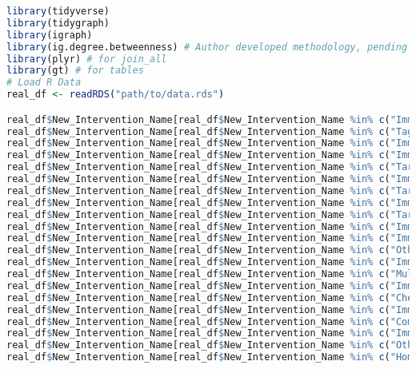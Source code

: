 \documentclass{article}
\begin{document}
\begin{lstlisting}[language=R]  % or Python, or whatever language
library(tidyverse)
library(tidygraph)
library(igraph)
library(ig.degree.betweenness) # Author developed methodology, pending public release
library(plyr) # for join_all
library(gt) # for tables
# Load R Data
real_df <- readRDS("path/to/data.rds")

real_df$New_Intervention_Name[real_df$New_Intervention_Name %in% c("Immunotherapy- MAbs-immunomodulatory-Checkpoint")] <- "I: MAbs Checkpoint";
real_df$New_Intervention_Name[real_df$New_Intervention_Name %in% c("Tageted therapy- antibody-drug conjugate")] <- "T: Antibody-Drug Conjugate";
real_df$New_Intervention_Name[real_df$New_Intervention_Name %in% c("Immunotherapy- MAbs-immunomodulatory-Co-Stimulatory")] <- "I: MAbs Co-Stimulatory";
real_df$New_Intervention_Name[real_df$New_Intervention_Name %in% c("Immunotherapy- Immuno + other investigational agent")] <- "I: Combined";
real_df$New_Intervention_Name[real_df$New_Intervention_Name %in% c("Targeted therapy - combined (small molecule + monoclonal antibody)")] <- "T: Combined";
real_df$New_Intervention_Name[real_df$New_Intervention_Name %in% c("Immunotherapy- MAbs- Tumour-targeting (includes immunoconjugates, naked MAbs)")] <- "I: MAbs Targeting";
real_df$New_Intervention_Name[real_df$New_Intervention_Name %in% c("Targeted therapy - small molecule")] <- "T: Small Molecule";
real_df$New_Intervention_Name[real_df$New_Intervention_Name %in% c("Immunotherapy- Other")] <- "I: Other";
real_df$New_Intervention_Name[real_df$New_Intervention_Name %in% c("Targeted therapy - monoclonal antibody")] <- "T: Monoclonal Antibody";
real_df$New_Intervention_Name[real_df$New_Intervention_Name %in% c("Immunotherapy- Adoptive Cell Transfer (e.g. TILS)")] <- "I: Adoptive Cell Transfer";
real_df$New_Intervention_Name[real_df$New_Intervention_Name %in% c("Immunotherapy- combined types")] <- "I: Combined";
real_df$New_Intervention_Name[real_df$New_Intervention_Name %in% c("Other - drug repurposing")] <- "Drug Repurposing";
real_df$New_Intervention_Name[real_df$New_Intervention_Name %in% c("Immunotherapy- Cytokines (eg. INFa, IL, Hematopoietic growth factors)")] <- "I: MAbs Co-Stimulatory";
real_df$New_Intervention_Name[real_df$New_Intervention_Name %in% c("Multiple- Biomarker Targeted")] <- "T: Combined";
real_df$New_Intervention_Name[real_df$New_Intervention_Name %in% c("Immunotherapy- Anti Cancer Vaccine- Peptide based vaccine")] <- "I: Anti Cancer Vaccine";
real_df$New_Intervention_Name[real_df$New_Intervention_Name %in% c("Chemotherapy")] <- "Chemotherapy";
real_df$New_Intervention_Name[real_df$New_Intervention_Name %in% c("Immunotherapy- Oncolytic Virus")] <- "I: Oncolytic Virus";
real_df$New_Intervention_Name[real_df$New_Intervention_Name %in% c("Combined modality (e.g chemoradiation, EBRT+Brachy)")] <- "Combined Modality";
real_df$New_Intervention_Name[real_df$New_Intervention_Name %in% c("Immunotherapy- Anti Cancer Vaccine- Gene Therapy (e.g DNA/RNA vaccines)")] <- "I: Anti Cancer Vaccine";
real_df$New_Intervention_Name[real_df$New_Intervention_Name %in% c("Other - radioconjugate")] <- "Radioconjugate";
real_df$New_Intervention_Name[real_df$New_Intervention_Name %in% c("Homonal Treatment")] <- "Drug Repurposing";



\end{lstlisting}
\end{document}
